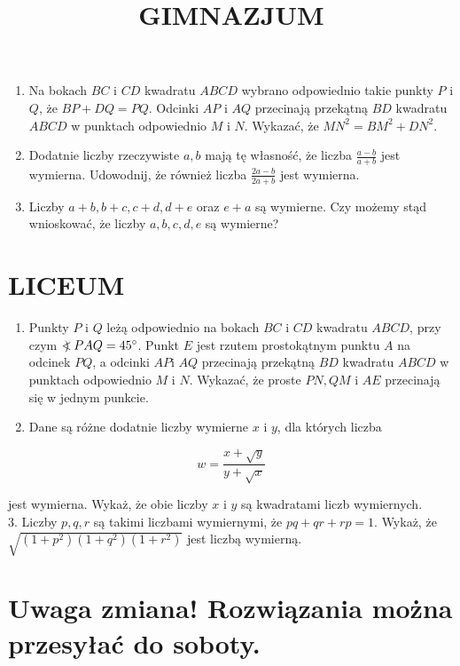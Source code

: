 \documentclass[10pt]{article}
\title{GIMNAZJUM }
\author{}
\date{}
\newcommand\Varangle{\mathop{{<\!\!\!\!\!\text{\small)}}\:}\nolimits}
\begin{document}
\maketitle
\begin{enumerate}
  \item Na bokach \(B C\) i \(C D\) kwadratu \(A B C D\) wybrano odpowiednio takie punkty \(P\) i \(Q\), że \(B P+D Q=P Q\). Odcinki \(A P\) i \(A Q\) przecinają przekątną \(B D\) kwadratu \(A B C D\) w punktach odpowiednio \(M\) i \(N\). Wykazać, że \(M N^{2}=B M^{2}+D N^{2}\).
  \item Dodatnie liczby rzeczywiste \(a, b\) mają tę własność, że liczba \(\frac{a-b}{a+b}\) jest wymierna. Udowodnij, że również liczba \(\frac{2 a-b}{2 a+b}\) jest wymierna.
  \item Liczby \(a+b, b+c, c+d, d+e\) oraz \(e+a\) są wymierne. Czy możemy stąd wnioskować, że liczby \(a, b, c, d, e\) są wymierne?
\end{enumerate}

\section*{LICEUM}
\begin{enumerate}
  \item Punkty \(P\) i \(Q\) leżą odpowiednio na bokach \(B C\) i \(C D\) kwadratu \(A B C D\), przy czym \(\Varangle P A Q=45^{\circ}\). Punkt \(E\) jest rzutem prostokątnym punktu \(A\) na odcinek \(P Q\), a odcinki \(A P \mathrm{i}\) \(A Q\) przecinają przekątną \(B D\) kwadratu \(A B C D\) w punktach odpowiednio \(M\) i \(N\). Wykazać, że proste \(P N, Q M\) i \(A E\) przecinają się w jednym punkcie.
  \item Dane są różne dodatnie liczby wymierne \(x\) i \(y\), dla których liczba
\end{enumerate}

\[
w=\frac{x+\sqrt{y}}{y+\sqrt{x}}
\]

jest wymierna. Wykaż, że obie liczby \(x\) i \(y\) są kwadratami liczb wymiernych.\\
3. Liczby \(p, q, r\) są takimi liczbami wymiernymi, że \(p q+q r+r p=1\). Wykaż, że \(\sqrt{\left(1+p^{2}\right)\left(1+q^{2}\right)\left(1+r^{2}\right)}\) jest liczbą wymierną.

\section*{Uwaga zmiana! Rozwiązania można przesyłać do soboty.}
\end{document}
